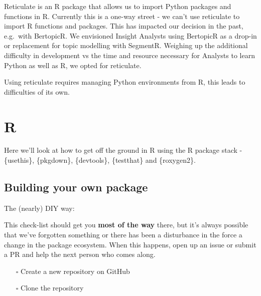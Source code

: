 \documentclass[
  letterpaper,
  DIV=11,
  numbers=noendperiod]{scrreprt}
\providecommand{\tightlist}{%
  \setlength{\itemsep}{0pt}\setlength{\parskip}{0pt}}\usepackage{longtable,booktabs,array}
\begin{document}
\begin{tcolorbox}[enhanced jigsaw, opacitybacktitle=0.6, breakable, title=\textcolor{quarto-callout-note-color}{\faInfo}\hspace{0.5em}{Reticulate}, arc=.35mm, colframe=quarto-callout-note-color-frame, colbacktitle=quarto-callout-note-color!10!white, left=2mm, bottomrule=.15mm, opacityback=0, toprule=.15mm, bottomtitle=1mm, toptitle=1mm, titlerule=0mm, leftrule=.75mm, colback=white, rightrule=.15mm, coltitle=black]

Reticulate is an R package that allows us to import Python packages and
functions in R. Currently this is a one-way street - we can't use
reticulate to import R functions and packages. This has impacted our
decision in the past, e.g.~with BertopicR. We envisioned Insight
Analysts using BertopicR as a drop-in or replacement for topic modelling
with SegmentR. Weighing up the additional difficulty in development vs
the time and resource necessary for Analysts to learn Python as well as
R, we opted for reticulate.

Using reticulate requires managing Python environments from R, this
leads to difficulties of its own.

\end{tcolorbox}

\chapter{R}\label{r}

Here we'll look at how to get off the ground in R using the R package
stack - \{usethis\}, \{pkgdown\}, \{devtools\}, \{testthat\} and
\{roxygen2\}.

\section{Building your own package}\label{building-your-own-package}

The (nearly) DIY way:

This check-list should get you \textbf{most of the way} there, but it's
always possible that we've forgotten something or there has been a
disturbance in the force a change in the package ecosystem. When this
happens, open up an issue or submit a PR and help the next person who
comes along.

\begin{itemize}
\tightlist
\item[$\square$]
  Create a new repository on GitHub
\item[$\square$]
  Clone the repository
\end{itemize}
\end{document}
